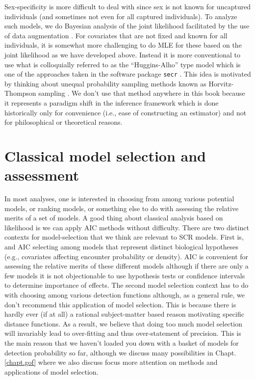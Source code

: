 Sex-specificity is more difficult to deal with since sex is not known
for uncaptured individuals (and sometimes not even for all captured
individuals).  To analyze such models, we do Bayesian analysis of the
joint likelihood facilitated by the use of data augmentation
\citep{gardner_etal:2010jwm,russell_etal:2012}. For covariates that are
not fixed and known for all individuals, it is somewhat more
challenging to do MLE for these based on the joint likelihood as we
have developed above. Instead it is more conventional to use what is
colloquially referred to as the ``Huggins-Alho'' type model which is
one of the approaches taken in the software package \mbox{\tt secr}
\citep[][see Sec. \ref{mle.sec.secr}]{efford:2011}. This idea is
motivated by thinking about unequal probability sampling methods known
as Horvitz-Thompson sampling \citep[e.g.,
see][]{overton_stehman:1995}.  We don't use that method anywhere in
this book because it represents a paradigm shift in the inference
framework which is done historically only for convenience (i.e., ease
of constructing an estimator) and not for philosophical or theoretical
reasons.






\section{Classical model selection and assessment}

In most analyses, one is interested in choosing from among various
potential models, or ranking models, or something else to do with
assessing the relative merits of a set of models. A good thing about
classical analysis based on likelihood is we can apply AIC methods
\citep{burnham_anderson:2002} without difficulty. There are two
distinct contexts for model-selection that we think are relevant to
SCR models. First is, and AIC selecting among models that represent
distinct biological hypotheses (e.g., covariates affecting encounter
probability or density). AIC is convenient for assessing the relative
merits of these different models although if there are only a few
models it is not objectionable to use hypothesis tests or confidence
intervals to determine importance of effects. The second model
selection context has to do with choosing among various detection
functions although, as a general rule, we don't recommend this
application of model selection.  This is because there is hardly ever
(if at all) a rational subject-matter based reason motivating specific
distance functions. As a result, we believe that doing too much model
selection will invariably lead to over-fitting and thus over-statement
of precision. This is the main reason that we haven't loaded you down
with a basket of models for detection probability so far, although we
discuss many possibilities in Chapt. \ref{chapt.gof} where we also
discuss focus more attention on methods and applications of model selection.


